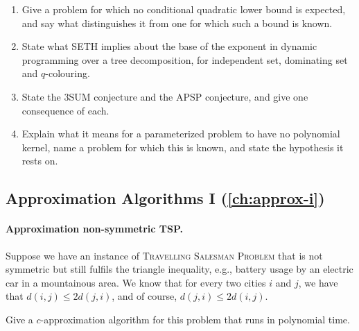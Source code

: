 \begin{enumerate}
        reductions differs from the last step of the Fr\'echet reduction.
  \item Give a problem for which no conditional quadratic lower bound is
        expected, and say what distinguishes it from one for which such a
        bound is known.
  \item State what SETH implies about the base of the exponent in dynamic
        programming over a tree decomposition, for independent set, dominating
        set and $q$-colouring.
  \item State the 3SUM conjecture and the APSP conjecture, and give one
        consequence of each.
  \item Explain what it means for a parameterized problem to have no polynomial
        kernel, name a problem for which this is known, and state the
        hypothesis it rests on.
\end{enumerate}

\subsection*{Approximation Algorithms I (\cref{ch:approx-i})}

\paragraph{Approximation non-symmetric TSP.}
Suppose we have an instance of \textsc{Travelling Salesman Problem} that is not
symmetric but still fulfils the triangle inequality, e.g., battery usage by an
electric car in a mountainous area. We know that for every two cities $i$ and
$j$, we have that $d(i,j) \le 2 d(j,i)$, and of course, $d(j,i) \le 2 d(i,j)$.

Give a $c$-approximation algorithm for this problem that runs in polynomial
time.

